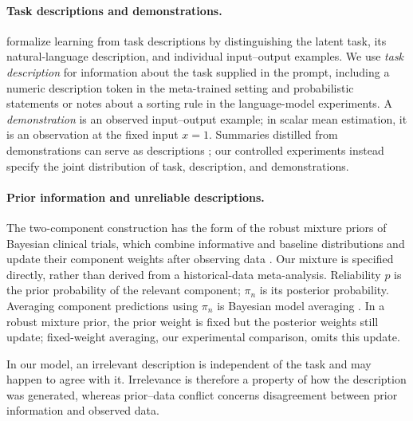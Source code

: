 \documentclass{article}
\theoremstyle{definition}
\begin{document}
\paragraph{Task descriptions and demonstrations.}
\citet{weller2020} formalize learning from task descriptions by distinguishing the latent task, its natural-language description, and individual input--output examples. We use \emph{task description} for information about the task supplied in the prompt, including a numeric description token in the meta-trained setting and probabilistic statements or notes about a sorting rule in the language-model experiments. A \emph{demonstration} is an observed input--output example; in scalar mean estimation, it is an observation at the fixed input $x=1$. Summaries distilled from demonstrations can serve as descriptions \citep{honda2025}; our controlled experiments instead specify the joint distribution of task, description, and demonstrations.

\paragraph{Prior information and unreliable descriptions.}
The two-component construction has the form of the robust mixture priors of Bayesian clinical trials, which combine informative and baseline distributions and update their component weights after observing data \citep{schmidli2014}. Our mixture is specified directly, rather than derived from a historical-data meta-analysis. Reliability $p$ is the prior probability of the relevant component; $\pi_n$ is its posterior probability. Averaging component predictions using $\pi_n$ is Bayesian model averaging \citep{hoeting1999}. In a robust mixture prior, the prior weight is fixed but the posterior weights still update; fixed-weight averaging, our experimental comparison, omits this update.

In our model, an irrelevant description is independent of the task and may happen to agree with it. Irrelevance is therefore a property of how the description was generated, whereas prior--data conflict concerns disagreement between prior information and observed data.
\end{document}
